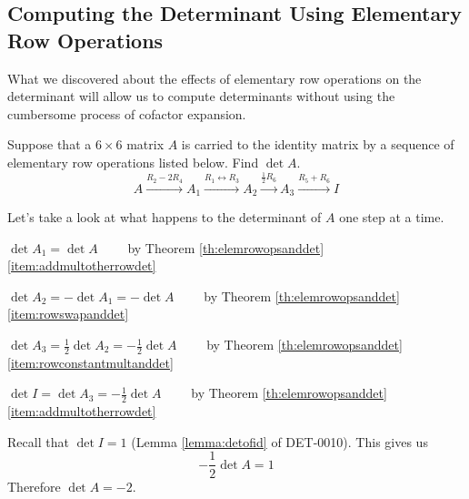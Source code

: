 \documentclass{ximera}
\begin{document}
\subsection*{Computing the Determinant Using Elementary Row Operations}
What we discovered about the effects of elementary row operations on the determinant will allow us to compute determinants without using the cumbersome process of cofactor expansion.

\begin{example}\label{ex:detandelemrowops} Suppose that a $6\times 6$ matrix $A$ is carried to the identity matrix by a sequence of elementary row operations listed below.  Find $\det{A}$.
$$A\xrightarrow{R_2-2R_4}A_1\xrightarrow{R_1\leftrightarrow R_3}A_2\xrightarrow{\frac{1}{2}R_6}A_3\xrightarrow{R_5+R_6}I$$
\begin{explanation}
Let's take a look at what happens to the determinant of $A$ one step at a time.  
\begin{center}
$\det{A_1}=\det{A}\quad\quad$ by Theorem \ref{th:elemrowopsanddet}\ref{item:addmultotherrowdet}

$\det{A_2}=-\det{A_1}=-\det{A}\quad\quad$ by Theorem \ref{th:elemrowopsanddet}\ref{item:rowswapanddet}

$\det{A_3}=\frac{1}{2}\det{A_2}=-\frac{1}{2}\det{A}\quad\quad$ by Theorem \ref{th:elemrowopsanddet}\ref{item:rowconstantmultanddet}

$\det{I}=\det{A_3}=-\frac{1}{2}\det{A}\quad\quad$ by Theorem \ref{th:elemrowopsanddet}\ref{item:addmultotherrowdet}
\end{center}

Recall that $\det{I}=1$ (Lemma \ref{lemma:detofid} of DET-0010).  This gives us
$$-\frac{1}{2}\det{A}=1$$
Therefore $\det{A}=-2$.

\end{explanation}
\end{example}
\end{document}
